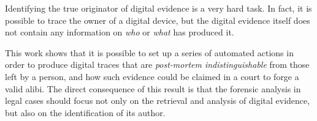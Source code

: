 \documentclass[runningheads]{llncs}
\begin{document}



Identifying the true originator of digital evidence is a very hard task.
In fact, it is possible to trace the owner of a digital device, but the digital evidence itself does not contain any information on \emph{who} or \emph{what} has produced it.

This work shows that it is possible to set up a series of automated actions in order to produce digital traces that are \emph{post-mortem indistinguishable} from those left by a person, and how such evidence could be claimed in a court to forge a valid alibi. The direct consequence of this result is that the forensic analysis in legal cases should focus not only on the retrieval and analysis of digital evidence, but also on the identification of its author.
\end{document}
